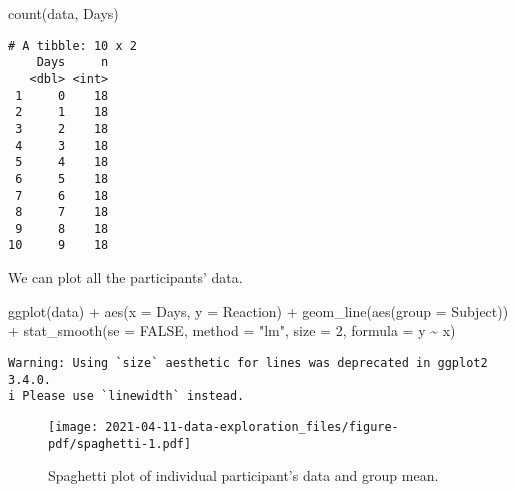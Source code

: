\documentclass[
  letterpaper,
  DIV=11,
  numbers=noendperiod]{scrreprt}
\newenvironment{Shaded}{\begin{snugshade}}{\end{snugshade}}
\newcommand{\AttributeTok}[1]{\textcolor[rgb]{0.40,0.45,0.13}{#1}}
\newcommand{\ConstantTok}[1]{\textcolor[rgb]{0.56,0.35,0.01}{#1}}
\newcommand{\DecValTok}[1]{\textcolor[rgb]{0.68,0.00,0.00}{#1}}
\newcommand{\FunctionTok}[1]{\textcolor[rgb]{0.28,0.35,0.67}{#1}}
\newcommand{\NormalTok}[1]{\textcolor[rgb]{0.00,0.23,0.31}{#1}}
\newcommand{\SpecialCharTok}[1]{\textcolor[rgb]{0.37,0.37,0.37}{#1}}
\newcommand{\StringTok}[1]{\textcolor[rgb]{0.13,0.47,0.30}{#1}}
\begin{document}
\begin{Shaded}
\begin{Highlighting}[]
\FunctionTok{count}\NormalTok{(data, Days)}
\end{Highlighting}
\end{Shaded}

\begin{verbatim}
# A tibble: 10 x 2
    Days     n
   <dbl> <int>
 1     0    18
 2     1    18
 3     2    18
 4     3    18
 5     4    18
 6     5    18
 7     6    18
 8     7    18
 9     8    18
10     9    18
\end{verbatim}

We can plot all the participants' data.

\begin{Shaded}
\begin{Highlighting}[]
\FunctionTok{ggplot}\NormalTok{(data) }\SpecialCharTok{+} 
  \FunctionTok{aes}\NormalTok{(}\AttributeTok{x =}\NormalTok{ Days, }\AttributeTok{y =}\NormalTok{ Reaction) }\SpecialCharTok{+} 
  \FunctionTok{geom\_line}\NormalTok{(}\FunctionTok{aes}\NormalTok{(}\AttributeTok{group =}\NormalTok{ Subject)) }\SpecialCharTok{+} 
  \FunctionTok{stat\_smooth}\NormalTok{(}\AttributeTok{se =} \ConstantTok{FALSE}\NormalTok{, }\AttributeTok{method =} \StringTok{"lm"}\NormalTok{, }\AttributeTok{size =} \DecValTok{2}\NormalTok{, }\AttributeTok{formula =}\NormalTok{ y }\SpecialCharTok{\textasciitilde{}}\NormalTok{ x)}
\end{Highlighting}
\end{Shaded}

\begin{verbatim}
Warning: Using `size` aesthetic for lines was deprecated in ggplot2 3.4.0.
i Please use `linewidth` instead.
\end{verbatim}

\begin{figure}[H]

{\centering \texttt{[image: 2021-04-11-data-exploration\_files/figure-pdf/spaghetti-1.pdf]}

}

\caption{Spaghetti plot of individual participant's data and group
mean.}

\end{figure}%
\end{document}
